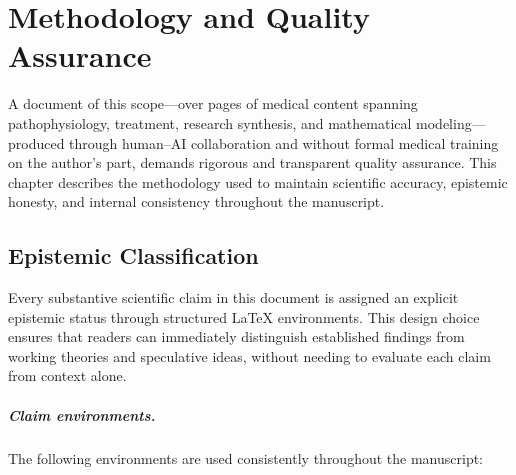 \chapter*{Methodology and Quality Assurance}
\label{ch:methodology}

A document of this scope---over \RoundedPageCount{} pages of medical content spanning pathophysiology, treatment, research synthesis, and mathematical modeling---produced through human--AI collaboration and without formal medical training on the author's part, demands rigorous and transparent quality assurance. This chapter describes the methodology used to maintain scientific accuracy, epistemic honesty, and internal consistency throughout the manuscript.

\section*{Epistemic Classification}
\label{sec:meth-epistemic}

Every substantive scientific claim in this document is assigned an explicit epistemic status through structured \LaTeX{} environments. This design choice ensures that readers can immediately distinguish established findings from working theories and speculative ideas, without needing to evaluate each claim from context alone.

\paragraph{Claim environments.}
The following environments are used consistently throughout the manuscript:

